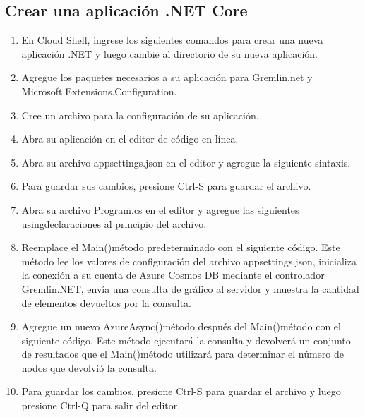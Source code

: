 \documentclass[12pt,letterpaper]{article}
\begin{document}
\begin{enumerate}
\begin{enumerate}
		
	
	
	\subsection{Crear una aplicación .NET Core }


	\begin{enumerate}
		
		\item En Cloud Shell, ingrese los siguientes comandos para crear una nueva aplicación .NET y luego cambie al directorio de su nueva aplicación.
	
		\item Agregue los paquetes necesarios a su aplicación para Gremlin.net y Microsoft.Extensions.Configuration.

	
		\item
		Cree un archivo para la configuración de su aplicación. 
	
		\item Abra su aplicación en el editor de código en línea.
		
		\item Abra su archivo appsettings.json en el editor y agregue la siguiente sintaxis.
		
		\item Para guardar sus cambios, presione Ctrl-S para guardar el archivo.
		
		\item Abra su archivo Program.cs en el editor y agregue las siguientes usingdeclaraciones al principio del archivo.
		
		\item Reemplace el Main()método predeterminado con el siguiente código. Este método lee los valores de configuración del archivo appsettings.json, inicializa la conexión a su cuenta de Azure Cosmos DB mediante el controlador Gremlin.NET, envía una consulta de gráfico al servidor y muestra la cantidad de elementos devueltos por la consulta.
		
		\item Agregue un nuevo AzureAsync()método después del Main()método con el siguiente código. Este método ejecutará la consulta y devolverá un conjunto de resultados que el Main()método utilizará para determinar el número de nodos que devolvió la consulta.
		
		\item Para guardar los cambios, presione Ctrl-S para guardar el archivo y luego presione Ctrl-Q para salir del editor.
		

\end{enumerate}
\end{enumerate}
\end{enumerate}
\end{document}
